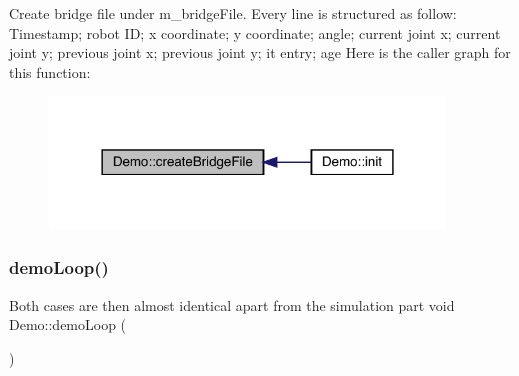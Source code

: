 Create bridge file under m\+\_\+bridge\+File. Every line is structured as follow\+: Timestamp; robot ID; x coordinate; y coordinate; angle; current joint x; current joint y; previous joint x; previous joint y; it entry; age Here is the caller graph for this function\+:\nopagebreak
\begin{figure}[H]
\begin{center}
\leavevmode
\includegraphics[width=298pt]{class_demo_ae0f7fe82aa44b946c13823d408b9ee01_icgraph}
\end{center}
\end{figure}
\mbox{\label{class_demo_a938c3b6ab1c98ce43f977dda9d4f2b3a}} 
\subsubsection{\texorpdfstring{demo\+Loop()}{demoLoop()}}
{\footnotesize\ttfamily Both cases are then almost identical apart from the simulation part void Demo\+::demo\+Loop (\begin{DoxyParamCaption}{ }\end{DoxyParamCaption})}

